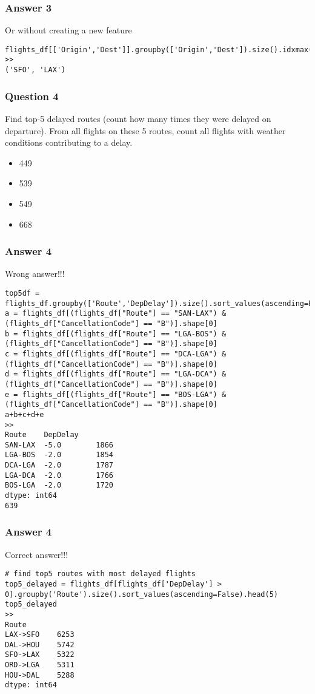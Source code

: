 \begin{frame}[fragile]\frametitle{Answer 3}
Or without creating a new feature
\begin{lstlisting}
flights_df[['Origin','Dest']].groupby(['Origin','Dest']).size().idxmax()
>>
('SFO', 'LAX')
\end{lstlisting}

\end{frame}


\begin{frame}[fragile]\frametitle{Question 4}
Find top-5 delayed routes (count how many times they were delayed on departure). From all flights on these 5 routes, count all flights with weather conditions contributing to a delay.
\begin{itemize}
\item 449
\item 539
\item 549
\item 668
\end{itemize}

\end{frame}

\begin{frame}[fragile]\frametitle{Answer 4}
Wrong answer!!!
\begin{lstlisting}
top5df = flights_df.groupby(['Route','DepDelay']).size().sort_values(ascending=False).iloc[:5]
a = flights_df[(flights_df["Route"] == "SAN-LAX") & (flights_df["CancellationCode"] == "B")].shape[0]
b = flights_df[(flights_df["Route"] == "LGA-BOS") & (flights_df["CancellationCode"] == "B")].shape[0] 
c = flights_df[(flights_df["Route"] == "DCA-LGA") & (flights_df["CancellationCode"] == "B")].shape[0] 
d = flights_df[(flights_df["Route"] == "LGA-DCA") & (flights_df["CancellationCode"] == "B")].shape[0] 
e = flights_df[(flights_df["Route"] == "BOS-LGA") & (flights_df["CancellationCode"] == "B")].shape[0] 
a+b+c+d+e
>>
Route    DepDelay
SAN-LAX  -5.0        1866
LGA-BOS  -2.0        1854
DCA-LGA  -2.0        1787
LGA-DCA  -2.0        1766
BOS-LGA  -2.0        1720
dtype: int64
639
\end{lstlisting}

\end{frame}

\begin{frame}[fragile]\frametitle{Answer 4}
Correct answer!!!
\begin{lstlisting}
# find top5 routes with most delayed flights
top5_delayed = flights_df[flights_df['DepDelay'] > 0].groupby('Route').size().sort_values(ascending=False).head(5)
top5_delayed
>>
Route
LAX->SFO    6253
DAL->HOU    5742
SFO->LAX    5322
ORD->LGA    5311
HOU->DAL    5288
dtype: int64
\end{lstlisting}

\end{frame}

